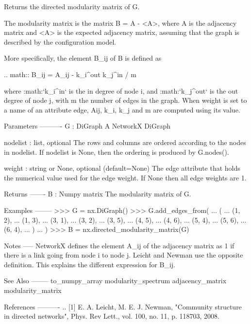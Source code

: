\begin{DoxyVerb}Returns the directed modularity matrix of G.

The modularity matrix is the matrix B = A - <A>, where A is the adjacency
matrix and <A> is the expected adjacency matrix, assuming that the graph
is described by the configuration model.

More specifically, the element B_ij of B is defined as

.. math::
    B_{ij} = A_{ij} - k_i^{out} k_j^{in} / m

where :math:`k_i^{in}` is the in degree of node i, and :math:`k_j^{out}` is the out degree
of node j, with m the number of edges in the graph. When weight is set
to a name of an attribute edge, Aij, k_i, k_j and m are computed using
its value.

Parameters
----------
G : DiGraph
   A NetworkX DiGraph

nodelist : list, optional
   The rows and columns are ordered according to the nodes in nodelist.
   If nodelist is None, then the ordering is produced by G.nodes().

weight : string or None, optional (default=None)
   The edge attribute that holds the numerical value used for
   the edge weight.  If None then all edge weights are 1.

Returns
-------
B : Numpy matrix
  The modularity matrix of G.

Examples
--------
>>> G = nx.DiGraph()
>>> G.add_edges_from(
...     (
...         (1, 2),
...         (1, 3),
...         (3, 1),
...         (3, 2),
...         (3, 5),
...         (4, 5),
...         (4, 6),
...         (5, 4),
...         (5, 6),
...         (6, 4),
...     )
... )
>>> B = nx.directed_modularity_matrix(G)


Notes
-----
NetworkX defines the element A_ij of the adjacency matrix as 1 if there
is a link going from node i to node j. Leicht and Newman use the opposite
definition. This explains the different expression for B_ij.

See Also
--------
to_numpy_array
modularity_spectrum
adjacency_matrix
modularity_matrix

References
----------
.. [1] E. A. Leicht, M. E. J. Newman,
    "Community structure in directed networks",
    Phys. Rev Lett., vol. 100, no. 11, p. 118703, 2008.
\end{DoxyVerb}
 \mbox{\label{namespacenetworkx_1_1linalg_1_1modularitymatrix_ad2111dca83033516eaad630b71f85e81}} 
